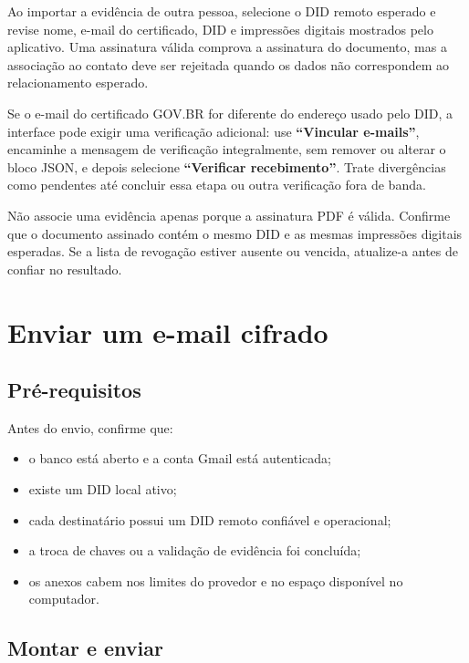 \documentclass[11pt,a4paper]{article}
\newcommand{\uis}[1]{\textbf{``#1''}}
\begin{document}
Ao importar a evidência de outra pessoa, selecione o DID remoto esperado e revise nome, e-mail do certificado, DID e impressões digitais mostrados pelo aplicativo. Uma assinatura válida comprova a assinatura do documento, mas a associação ao contato deve ser rejeitada quando os dados não correspondem ao relacionamento esperado.

Se o e-mail do certificado GOV.BR for diferente do endereço usado pelo DID, a interface pode exigir uma verificação adicional: use \uis{Vincular e-mails}, encaminhe a mensagem de verificação integralmente, sem remover ou alterar o bloco JSON, e depois selecione \uis{Verificar recebimento}. Trate divergências como pendentes até concluir essa etapa ou outra verificação fora de banda.

\begin{warningbox}
  Não associe uma evidência apenas porque a assinatura PDF é válida. Confirme que o documento assinado contém o mesmo DID e as mesmas impressões digitais esperadas. Se a lista de revogação estiver ausente ou vencida, atualize-a antes de confiar no resultado.
\end{warningbox}

\clearpage
\section{Enviar um e-mail cifrado}

\subsection{Pré-requisitos}

Antes do envio, confirme que:

\begin{itemize}
  \item o banco está aberto e a conta Gmail está autenticada;
  \item existe um DID local ativo;
  \item cada destinatário possui um DID remoto confiável e operacional;
  \item a troca de chaves ou a validação de evidência foi concluída;
  \item os anexos cabem nos limites do provedor e no espaço disponível no computador.
\end{itemize}

\subsection{Montar e enviar}
\end{document}
